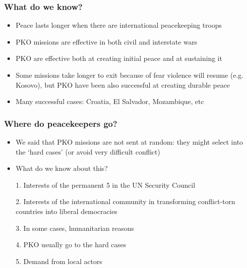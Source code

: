 \documentclass[aspectratio=43]{beamer}
\begin{document}
\begin{frame}
\frametitle{What do we know?}
\centering

\begin{itemize}[<+->]
  \item Peace lasts longer when there are international peacekeeping troops
  \item PKO missions are effective in both civil and interstate wars
  \item PKO are effective both at creating initial peace and at sustaining it
  \item Some missions take longer to exit because of fear violence will resume (e.g. Kosovo), but PKO have been also successful at creating durable peace
  \item Many successful cases: Croatia, El Salvador, Mozambique, etc
\end{itemize}

\end{frame}

\begin{frame}
\frametitle{Where do peacekeepers go?}
\centering

\begin{itemize}[<+->]
  \item We said that PKO missions are not sent at random: they might select into the `hard cases' (or avoid very difficult conflict)
  \item What do we know about this?
  \item[1.] Interests of the permanent 5 in the UN Security Council
  \item[2.] Interests of the international community in transforming conflict-torn countries into liberal democracies
  \item[3.] In some cases, humanitarian reasons
  \item[4.] PKO usually go to the hard cases
  \item[5.] Demand from local actors
\end{itemize}

\end{frame}
\end{document}
